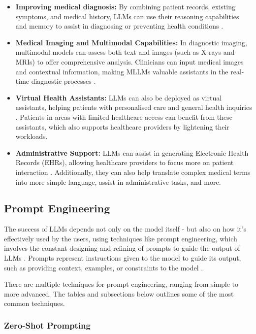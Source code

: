 \begin{itemize}
    \item \textbf{Improving medical diagnosis:} By combining patient records, existing symptoms, and medical history, LLMs can use their reasoning capabilities and memory to assist in diagnosing or preventing health conditions \parencite{llm_healthcare,llm_healthcare3,llm_healthcare4}.
    \item \textbf{Medical Imaging and Multimodal Capabilities:} In diagnostic imaging, multimodal models can assess both text and images (such as X-rays and MRIs) to offer comprehensive analysis. Clinicians can input medical images and contextual information, making MLLMs valuable assistants in the real-time diagnostic processes \parencite{llm_healthcare3}.
    \item \textbf{Virtual Health Assistants:} LLMs can also be deployed as virtual assistants, helping patients with personalised care and general health inquiries \parencite{llm_healthcare,llm_healthcare3}. Patients in areas with limited healthcare access can benefit from these assistants, which also supports healthcare providers by lightening their workloads.
    \item \textbf{Administrative Support:} LLMs can assist in generating Electronic Health Records (EHRs), allowing healthcare providers to focus more on patient interaction \parencite{llm_healthcare4}. Additionally, they can also help translate complex medical terms into more simple language, assist in administrative tasks, and more.
\end{itemize}

\subsection{Prompt Engineering}

The success of LLMs depends not only on the model itself - but also on how it's effectively used by the users, using techniques like prompt engineering, which involves the constant designing and refining of prompts to guide the output of LLMs \parencite{promptmed,prompt2}. Prompts represent instructions given to the model to guide its output, such as providing context, examples, or constraints to the model \parencite{prompt,prompt1,prompt2}. 

There are multiple techniques for prompt engineering, ranging from simple to more advanced. The tables and subsections below outlines some of the most common techniques.

\subsubsection{Zero-Shot Prompting}

